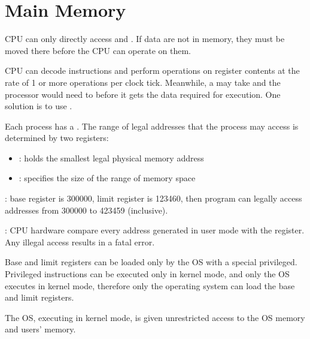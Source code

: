 
\chapter{Main Memory}

        \par CPU can only directly access  and . If data are not in memory, they must be moved there before the CPU can operate on them.
        \par CPU can decode instructions and perform operations on register contents at the rate of 1 or more operations per clock tick. Meanwhile, a  may take  and the processor would need to  before it gets the data required for execution. One solution is to use .
    
      \par Each process has a . The range of legal addresses that the process may access is determined by two registers:
        \begin{itemize}
          \item {}: holds the smallest legal physical memory address
          \item {}: specifies the size of the range of memory space
        \end{itemize}
      \par {}: base register is 300000, limit register is 123460, then program can legally access addresses from 300000 to 423459 (inclusive).
      \par {}: CPU hardware compare every address generated in user mode with the register. Any illegal access results in a fatal error.
      \par Base and limit registers can be loaded only by the OS with a special privileged. Privileged instructions can be executed only in kernel mode, and only the OS executes in kernel mode, therefore only the operating system can load the base and limit registers.
      \par The OS, executing in kernel mode, is given unrestricted access to the OS memory and users' memory.

